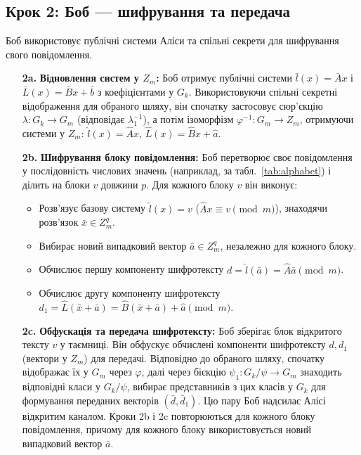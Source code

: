 \subsection{Крок 2: Боб — шифрування та передача}
\label{subsec:protocol_step2_bob}
Боб використовує публічні системи Аліси та спільні секрети для шифрування свого повідомлення.
\begin{enumerate}
    \item[\textbf{2a.}] \textbf{Відновлення систем у $Z_m$:} Боб отримує публічні системи $\bar{l}(x) = \bar{A}x$ і $\bar{L}(x) = \bar{B}x + \bar{b}$ з коефіцієнтами у $G_k$.
    Використовуючи спільні секретні відображення для обраного шляху, він спочатку застосовує сюр'єкцію $\lambda: G_k \to G_m$ (відповідає $\lambda_1^{-1}$), а потім ізоморфізм $\varphi^{-1}: G_m \to Z_m$, отримуючи системи у $Z_m$: $\hat{l}(x) = \hat{A}x$, $\hat{L}(x) = \hat{B}x + \hat{a}$.
    \item[\textbf{2b.}] \textbf{Шифрування блоку повідомлення:} Боб перетворює своє повідомлення у послідовність числових значень (наприклад, за табл.~\ref{tab:alphabet}) і ділить на блоки $v$ довжини $p$.
    Для кожного блоку $v$ він виконує:
    \begin{itemize}
        \item Розв'язує базову систему $\hat{l}(x) = v$ ($\hat{A}x \equiv v \pmod{m}$), знаходячи розв'язок $\bar{x} \in Z_m^q$.
        \item Вибирає новий випадковий вектор $\bar{a} \in Z_m^q$, незалежно для кожного блоку.
        \item Обчислює першу компоненту шифротексту $d = \hat{l}(\bar{a}) = \hat{A}\bar{a} \pmod{m}$.
        \item Обчислює другу компоненту шифротексту $d_1 = \hat{L}(\bar{x} + \bar{a}) = \hat{B}(\bar{x} + \bar{a}) + \hat{a} \pmod{m}$.
    \end{itemize}
    \item[\textbf{2c.}] \textbf{Обфускація та передача шифротексту:} Боб зберігає блок відкритого тексту $v$ у таємниці.
    Він обфускує обчислені компоненти шифротексту $d, d_1$ (вектори у $Z_m$) для передачі.
    Відповідно до обраного шляху, спочатку відображає їх у $G_m$ через $\varphi$, далі через бієкцію $\psi_1: G_k/\psi \to G_m$ знаходить відповідні класи у $G_k/\psi$, вибирає представників з цих класів у $G_k$ для формування переданих векторів $(\bar{d}, \bar{d}_1)$.
    Цю пару Боб надсилає Алісі відкритим каналом.
    Кроки 2b і 2c повторюються для кожного блоку повідомлення, причому для кожного блоку використовується новий випадковий вектор $\bar{a}$.
\end{enumerate}

